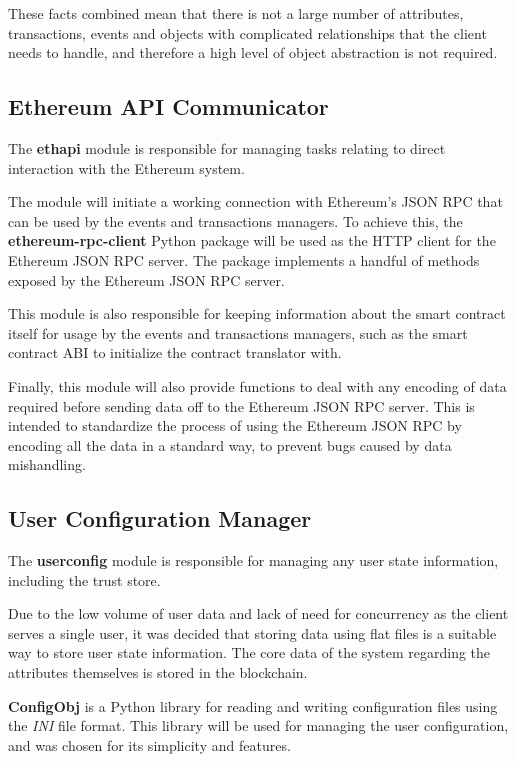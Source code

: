 \documentclass[12pt,a4paper]{report}
\begin{document}
	These facts combined mean that there is not a large number of attributes, transactions, events and objects with complicated relationships that the client needs to handle, and therefore a high level of object abstraction is not required.
	
	\subsection{Ethereum API Communicator}
	The \textbf{ethapi} module is responsible for managing tasks relating to direct interaction with the Ethereum system.
	
	The module will initiate a working connection with Ethereum's JSON RPC that can be used by the events and transactions managers. To achieve this, the \textbf{ethereum-rpc-client} Python package will be used as the HTTP client for the Ethereum JSON RPC server. The package implements a handful of methods exposed by the Ethereum JSON RPC server.\cite{18}
	
	This module is also responsible for keeping information about the smart contract itself for usage by the events and transactions managers, such as the smart contract ABI to initialize the contract translator with.
	
	Finally, this module will also provide functions to deal with any encoding of data required before sending data off to the Ethereum JSON RPC server. This is intended to standardize the process of using the Ethereum JSON RPC by encoding all the data in a standard way, to prevent bugs caused by data mishandling.
	
	\subsection{User Configuration Manager}
	The \textbf{userconfig} module is responsible for managing any user state information, including the trust store.
	
	Due to the low volume of user data and lack of need for concurrency as the client serves a single user, it was decided that storing data using flat files is a suitable way to store user state information. The core data of the system regarding the attributes themselves is stored in the blockchain.
	
	\textbf{ConfigObj} is a Python library for reading and writing configuration files using the \textit{INI} file format. This library will be used for managing the user configuration, and was chosen for its simplicity and features.
	
\end{document}
